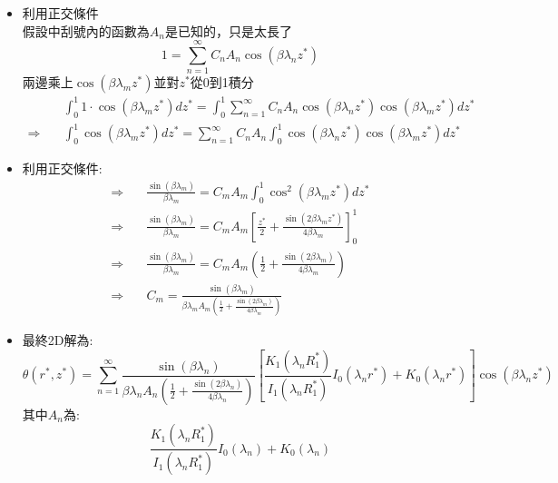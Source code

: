 \documentclass[../main.tex]{subfiles}
\begin{document}
\begin{itemize}
\begin{itemize}
      \begin{equation}
        1 = \sum_{n=1}^\infty C_n \left[
          \frac{K_1(\lambda_n R_1^\ast)}{I_1(\lambda_n R_1^\ast)} I_0(\lambda_n) + K_0(\lambda_n)
        \right]\cos(\beta \lambda_n z^\ast)
      \end{equation}
      \item 利用正交條件\\
      假設中刮號內的函數為$A_n$是已知的，只是太長了
      \begin{equation}
        1 = \sum_{n=1}^\infty C_n A_n \cos(\beta \lambda_n z^\ast)
      \end{equation}
      兩邊乘上$\cos(\beta \lambda_m z^\ast)$並對$z^\ast$從0到1積分
      \begin{align}
        & \int_0^1 1 \cdot \cos(\beta \lambda_m z^\ast) dz^\ast
        = \int_0^1 \sum_{n=1}^\infty C_n A_n \cos(\beta \lambda_n z^\ast) \cos(\beta \lambda_m z^\ast) dz^\ast \nonumber\\
        \Rightarrow\quad & \int_0^1 \cos(\beta \lambda_m z^\ast) dz^\ast
        = \sum_{n=1}^\infty C_n A_n \int_0^1 \cos(\beta \lambda_n z^\ast) \cos(\beta \lambda_m z^\ast) dz^\ast \nonumber
      \end{align}
      \item 利用正交條件:
      \begin{align}
        \Rightarrow\quad & \frac{\sin(\beta \lambda_m)}{\beta \lambda_m}
        = C_m A_m \int_0^1 \cos^2(\beta \lambda_m z^\ast) dz^\ast \nonumber\\
        \Rightarrow\quad & \frac{\sin(\beta \lambda_m)}{\beta \lambda_m}
        = C_m A_m \left[
          \frac{z^\ast}{2} + \frac{\sin(2\beta \lambda_m z^\ast)}{4\beta \lambda_m}
        \right]_0^1 \nonumber\\
        \Rightarrow\quad & \frac{\sin(\beta \lambda_m)}{\beta \lambda_m}
        = C_m A_m \left(
          \frac{1}{2} + \frac{\sin(2\beta \lambda_m)}{4\beta \lambda_m}
        \right) \nonumber\\
        \Rightarrow\quad & C_m = \frac{\sin(\beta \lambda_m)}{\beta \lambda_m A_m \left(
          \frac{1}{2} + \frac{\sin(2\beta \lambda_m)}{4\beta \lambda_m}
        \right)} \label{eq:circular_fin_Bessel_2D_Cm}
      \end{align}
      \item 最終2D解為:
      \begin{equation}
        \theta(r^\ast, z^\ast) = \sum_{n=1}^\infty \frac{\sin(\beta \lambda_n)}{\beta \lambda_n A_n \left(
          \frac{1}{2} + \frac{\sin(2\beta \lambda_n)}{4\beta \lambda_n}
        \right)}\left[
          \frac{K_1(\lambda_n R_1^\ast)}{I_1(\lambda_n R_1^\ast)} I_0(\lambda_n r^\ast) + K_0(\lambda_n r^\ast)
        \right] \cos(\beta \lambda_n z^\ast)
      \end{equation}
      其中$A_n$為:
      \begin{equation}
        \frac{K_1(\lambda_n R_1^\ast)}{I_1(\lambda_n R_1^\ast)} I_0(\lambda_n) + K_0(\lambda_n)
      \end{equation}
    \end{itemize}
  \end{itemize}
\end{document}
